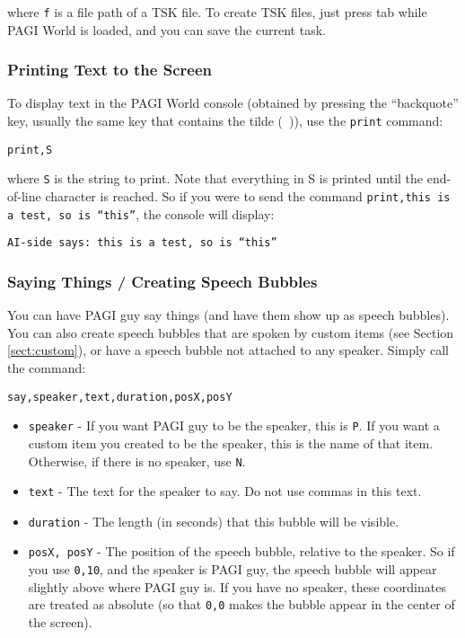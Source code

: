 \noindent where \texttt{f} is a file path of a TSK file. To create TSK files, just press tab while PAGI World is loaded, and you can save the current task.

\subsubsection{Printing Text to the Screen}

To display text in the PAGI World console (obtained by pressing the ``backquote'' key, usually the same key that contains the tilde (~)), use the \texttt{print} command:

\texttt{print,S}

\noindent where \texttt{S} is the string to print. Note that everything in S is printed until the end-of-line character is reached. So if you were to send the command \texttt{print,this is a test, so is ``this''}, the console will display:

\texttt{AI-side says: this is a test, so is ``this''}

\subsubsection{Saying Things / Creating Speech Bubbles}
\label{sect:speech}

You can have PAGI guy say things (and have them show up as speech bubbles). You can also create speech bubbles that are spoken by custom items (see Section \ref{sect:custom}), or have a speech bubble not attached to any speaker. Simply call the command:

\texttt{say,speaker,text,duration,posX,posY}

\begin{itemize}
\item \texttt{speaker} - If you want PAGI guy to be the speaker, this is \texttt{P}. If you want a custom item you created to be the speaker, this is the name of that item. Otherwise, if there is no speaker, use \texttt{N}.
\item \texttt{text} - The text for the speaker to say. Do not use commas in this text.
\item \texttt{duration} - The length (in seconds) that this bubble will be visible.
\item \texttt{posX, posY} - The position of the speech bubble, relative to the speaker. So if you use \texttt{0,10}, and the speaker is PAGI guy, the speech bubble will appear slightly above where PAGI guy is. If you have no speaker, these coordinates are treated as absolute (so that \texttt{0,0} makes the bubble appear in the center of the screen).
\end{itemize}

